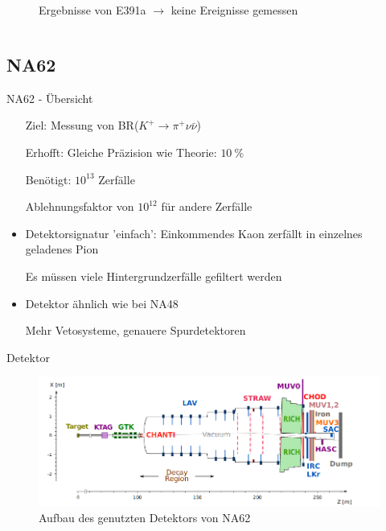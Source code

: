 \documentclass[aspectratio=1610, professionalfonts, 9pt, t]{beamer}
\begin{document}
\begin{frame}
\begin{columns}[onlytextwidth]
\begin{column}{0.5\textwidth}
\begin{figure}[ht]
\begin{center}
            \caption{Ergebnisse von E391a $\rightarrow$ keine Ereignisse gemessen}
          \end{center}
        \end{figure}
      \end{column}
    \end{columns}
\end{frame}


  \subsection{NA62}

  \begin{frame}{NA62 - Übersicht}
    \begin{itemize}
      \setlength{\itemindent}{0.5cm}
      \item[Ziel:] Messung von BR($K^+ \rightarrow \pi^+ \nu \bar{\nu}$)
      \item[Erhofft:] Gleiche Präzision wie Theorie: $\SI{10}{\percent}$
      \item[Benötigt:] $10^{13}$ Zerfälle
    \end{itemize}
    \begin{itemize}
      \item[\rightarrow] Ablehnungsfaktor von $10^{12}$ für andere Zerfälle
      \item Detektorsignatur 'einfach': Einkommendes Kaon zerfällt in einzelnes geladenes Pion
      \item[\rightarrow] Es müssen viele Hintergrundzerfälle gefiltert werden
      \item Detektor ähnlich wie bei NA48
      \item[\rightarrow] Mehr Vetosysteme, genauere Spurdetektoren
    \end{itemize}
  \end{frame}

  \begin{frame}{Detektor}
    \begin{figure}[ht]
      \includegraphics[height=0.75\textheight]{Images/na62detektor.png}
      \caption{Aufbau des genutzten Detektors von NA62}%
    \end{figure}
  \end{frame}
\end{document}
